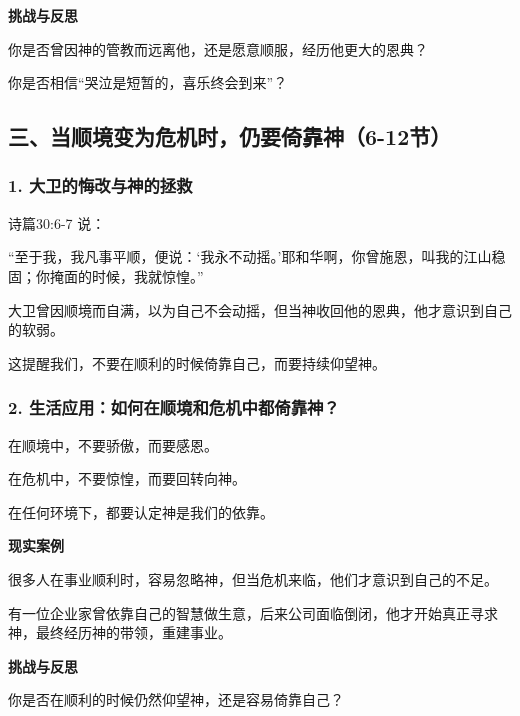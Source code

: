 \documentclass[a4paper, 12pt]{article}
\begin{document}
\vspace{0.2cm}

\textbf{挑战与反思}

\hspace{0.6cm}你是否曾因神的管教而远离他，还是愿意顺服，经历他更大的恩典？

\hspace{0.6cm}你是否相信“哭泣是短暂的，喜乐终会到来”？
\subsection*{三、当顺境变为危机时，仍要倚靠神（6-12节）}
\subsubsection*{1. 大卫的悔改与神的拯救}
\hspace{0.6cm}诗篇30:6-7 说：

“至于我，我凡事平顺，便说：‘我永不动摇。’耶和华啊，你曾施恩，叫我的江山稳固；你掩面的时候，我就惊惶。”


大卫曾因顺境而自满，以为自己不会动摇，但当神收回他的恩典，他才意识到自己的软弱。

这提醒我们，不要在顺利的时候倚靠自己，而要持续仰望神。
\subsubsection*{2. 生活应用：如何在顺境和危机中都倚靠神？}

\hspace{0.6cm}在顺境中，不要骄傲，而要感恩。

在危机中，不要惊惶，而要回转向神。

在任何环境下，都要认定神是我们的依靠。

\vspace{0.2cm}

\textbf{现实案例}

\hspace{0.6cm}很多人在事业顺利时，容易忽略神，但当危机来临，他们才意识到自己的不足。

\hspace{0.6cm}有一位企业家曾依靠自己的智慧做生意，后来公司面临倒闭，他才开始真正寻求神，最终经历神的带领，重建事业。

\vspace{0.2cm}

\textbf{挑战与反思}

\hspace{0.6cm}你是否在顺利的时候仍然仰望神，还是容易倚靠自己？
\end{document}
